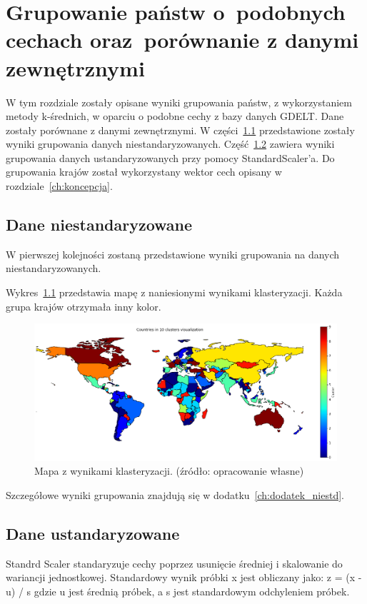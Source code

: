 \documentclass[11pt]{report}
\begin{document}
    \chapter[Grupowanie państw]{Grupowanie państw o~podobnych cechach oraz~porównanie z danymi zewnętrznymi}\label{ch:grupowanie-państw-opodobnych-cechach-orazporównanie-z-danymi-zewnętrznymi}

    W tym rozdziale zostały opisane wyniki grupowania państw, z wykorzystaniem metody k-średnich, w oparciu o podobne cechy z bazy danych GDELT.
    Dane zostały porównane z danymi zewnętrznymi.
    W części~\ref{sec:dane-niestandaryzowane} przedstawione zostały wyniki grupowania danych niestandaryzowanych.
    Część~\ref{sec:dane-ustandaryzowane} zawiera wyniki grupowania danych ustandaryzowanych przy pomocy StandardScaler'a.
    Do grupowania krajów został wykorzystany wektor cech opisany w rozdziale~\ref{ch:koncepcja}.


    \section{Dane niestandaryzowane}\label{sec:dane-niestandaryzowane}
    W pierwszej kolejności zostaną przedstawione wyniki grupowania na danych niestandaryzowanych.

    Wykres~\ref{fig:clust10} przedstawia mapę z naniesionymi wynikami klasteryzacji.
    Każda grupa krajów otrzymała inny kolor.

    \begin{figure}[!htp]
        \centering
        \includegraphics[width=\linewidth]{fig/CLUST/10clusterMap.png}
        \caption{Mapa z wynikami klasteryzacji. (źródło: opracowanie własne)}
        \label{fig:clust10}
    \end{figure}

    Szczegółowe wyniki grupowania znajdują się w dodatku~\ref{ch:dodatek_niestd}.


    \section{Dane ustandaryzowane}\label{sec:dane-ustandaryzowane}
    Standrd Scaler standaryzuje cechy poprzez usunięcie średniej i skalowanie do wariancji jednostkowej.
    Standardowy wynik próbki x jest obliczany jako:
    z = (x - u) / s
    gdzie u jest średnią próbek, a s jest standardowym odchyleniem próbek.
\end{document}
